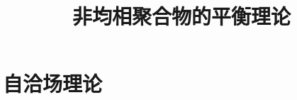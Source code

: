 \documentclass[12pt,a4paper]{article}
\title{非均相聚合物的平衡理论}
\author{}
\date{\chntoday}
\numberwithin{equation}{section}
\begin{document}
\maketitle
\section{自洽场理论}






\cite{tam19912d}

\end{document}
